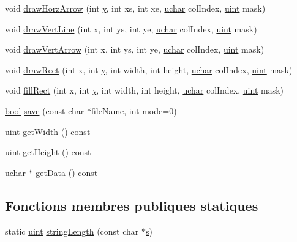 \begin{DoxyCompactItemize}
\item 
void \hyperlink{class_image_a4fba4fc168bfae61e0e7b5856c36d922}{draw\+Horz\+Arrow} (int \hyperlink{058__bracket__recursion_8tcl_a2fb1c5cf58867b5bbc9a1b145a86f3a0}{y}, int xs, int xe, \hyperlink{qglobal_8h_a65f85814a8290f9797005d3b28e7e5fc}{uchar} col\+Index, \hyperlink{qglobal_8h_a4d3943ddea65db7163a58e6c7e8df95a}{uint} mask)
\item 
void \hyperlink{class_image_a75bbaa68f25757917e87d08fd9d02606}{draw\+Vert\+Line} (int x, int ys, int ye, \hyperlink{qglobal_8h_a65f85814a8290f9797005d3b28e7e5fc}{uchar} col\+Index, \hyperlink{qglobal_8h_a4d3943ddea65db7163a58e6c7e8df95a}{uint} mask)
\item 
void \hyperlink{class_image_a6b9baea7dac381277b7df7eab9d0fc4e}{draw\+Vert\+Arrow} (int x, int ys, int ye, \hyperlink{qglobal_8h_a65f85814a8290f9797005d3b28e7e5fc}{uchar} col\+Index, \hyperlink{qglobal_8h_a4d3943ddea65db7163a58e6c7e8df95a}{uint} mask)
\item 
void \hyperlink{class_image_ab60719f8c7153f155c6b15676b4e821f}{draw\+Rect} (int x, int \hyperlink{058__bracket__recursion_8tcl_a2fb1c5cf58867b5bbc9a1b145a86f3a0}{y}, int width, int height, \hyperlink{qglobal_8h_a65f85814a8290f9797005d3b28e7e5fc}{uchar} col\+Index, \hyperlink{qglobal_8h_a4d3943ddea65db7163a58e6c7e8df95a}{uint} mask)
\item 
void \hyperlink{class_image_a2192a6addb48198a3206f23c77922640}{fill\+Rect} (int x, int \hyperlink{058__bracket__recursion_8tcl_a2fb1c5cf58867b5bbc9a1b145a86f3a0}{y}, int width, int height, \hyperlink{qglobal_8h_a65f85814a8290f9797005d3b28e7e5fc}{uchar} col\+Index, \hyperlink{qglobal_8h_a4d3943ddea65db7163a58e6c7e8df95a}{uint} mask)
\item 
\hyperlink{qglobal_8h_a1062901a7428fdd9c7f180f5e01ea056}{bool} \hyperlink{class_image_a8e4b382c51788279b5110651e36e1043}{save} (const char $\ast$file\+Name, int mode=0)
\item 
\hyperlink{qglobal_8h_a4d3943ddea65db7163a58e6c7e8df95a}{uint} \hyperlink{class_image_afa360719f0ecc7811b099966008c76ba}{get\+Width} () const 
\item 
\hyperlink{qglobal_8h_a4d3943ddea65db7163a58e6c7e8df95a}{uint} \hyperlink{class_image_ad20bbd7c31b62baeb3d50dd1f8aa8b24}{get\+Height} () const 
\item 
\hyperlink{qglobal_8h_a65f85814a8290f9797005d3b28e7e5fc}{uchar} $\ast$ \hyperlink{class_image_a94d3c15b3c4bf057ee3b875113eb3189}{get\+Data} () const 
\end{DoxyCompactItemize}
\subsection*{Fonctions membres publiques statiques}
\begin{DoxyCompactItemize}
\item 
static \hyperlink{qglobal_8h_a4d3943ddea65db7163a58e6c7e8df95a}{uint} \hyperlink{class_image_a0646bebccb54e618889304a53ae93f14}{string\+Length} (const char $\ast$\hyperlink{060__command__switch_8tcl_a011c73f2dbb87635a3b4206c72355f6e}{s})
\end{DoxyCompactItemize}
